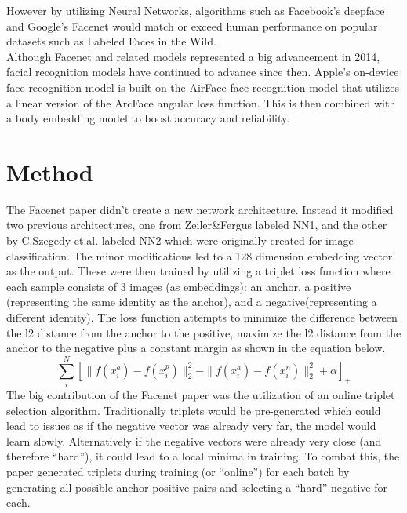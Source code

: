 \documentclass[10pt,twocolumn,letterpaper]{article}
\begin{document}
However by utilizing Neural Networks, algorithms such as Facebook's deepface and Google's Facenet would match or exceed human performance on popular datasets such as Labeled Faces in the Wild.\\

Although Facenet and related models represented a big advancement in 2014, facial recognition models have continued to advance since then.
Apple's on-device face recognition model is built on the AirFace face recognition model that utilizes a linear version of the ArcFace angular loss function.
This is then combined with a body embedding model to boost accuracy and reliability. 

\section{Method}
The Facenet paper didn't create a new network architecture.
Instead it modified two previous architectures, one from Zeiler\&Fergus labeled NN1, and the other by C.Szegedy et.al. labeled NN2 which were originally created for image classification.
The minor modifications led to a 128 dimension embedding vector as the output.
These were then trained by utilizing a triplet loss function where each sample consists of 3 images (as embeddings): an anchor, a positive (representing the same identity as the anchor), and a negative(representing a different identity).
The loss function attempts to minimize the difference between the l2 distance from the anchor to the positive, maximize the l2 distance from the anchor to the negative plus a constant margin as shown in the equation below.\\
\begin{equation}
   \sum_{i}^{N} \left[\|f(x_i^a) - f(x_i^p) \|_2^2 - \|f(x_i^a) - f(x_i^n) \|_2^2 + \alpha\right]_+
\end{equation}
The big contribution of the Facenet paper was the utilization of an online triplet selection algorithm.
Traditionally triplets would be pre-generated which could lead to issues as if the negative vector was already very far, the model would learn slowly.
Alternatively if the negative vectors were already very close (and therefore “hard”), it could lead to a local minima in training.
To combat this, the paper generated triplets during training (or “online”) for each batch by generating all possible anchor-positive pairs and selecting a “hard” negative for each.\\
\end{document}
